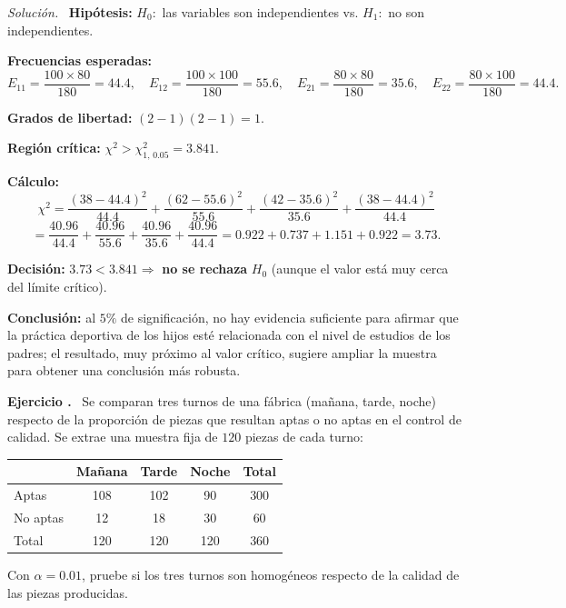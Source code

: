 \documentclass[11pt,a4paper]{article}
\newcounter{ejnum}
\newenvironment{ejercicio}{\refstepcounter{ejnum}\par\medskip\noindent\textbf{Ejercicio \theejnum.}~}{\par}
\newenvironment{solucion}{\par\noindent\textit{Solución.}~}{\par\vspace{1em}}
\begin{document}
\begin{solucion}
\textbf{Hipótesis:} $H_0:$ las variables son independientes vs. $H_1:$ no son independientes.

\textbf{Frecuencias esperadas:}
\[
E_{11}=\frac{100\times80}{180}=44.4,\quad E_{12}=\frac{100\times100}{180}=55.6,\quad E_{21}=\frac{80\times80}{180}=35.6,\quad E_{22}=\frac{80\times100}{180}=44.4.
\]

\textbf{Grados de libertad:} $(2-1)(2-1)=1$.

\textbf{Región crítica:} $\chi^2>\chi^2_{1,\,0.05}=3.841$.

\textbf{Cálculo:}
\[
\chi^2=\frac{(38-44.4)^2}{44.4}+\frac{(62-55.6)^2}{55.6}+\frac{(42-35.6)^2}{35.6}+\frac{(38-44.4)^2}{44.4}
\]
\[
=\frac{40.96}{44.4}+\frac{40.96}{55.6}+\frac{40.96}{35.6}+\frac{40.96}{44.4}=0.922+0.737+1.151+0.922=3.73.
\]

\textbf{Decisión:} $3.73<3.841\Rightarrow$ \textbf{no se rechaza} $H_0$ (aunque el valor está muy cerca del límite crítico).

\textbf{Conclusión:} al $5\%$ de significación, no hay evidencia suficiente para afirmar que la práctica deportiva de los hijos esté relacionada con el nivel de estudios de los padres; el resultado, muy próximo al valor crítico, sugiere ampliar la muestra para obtener una conclusión más robusta.
\end{solucion}

\begin{ejercicio}
Se comparan tres turnos de una fábrica (mañana, tarde, noche) respecto de la proporción de piezas que resultan aptas o no aptas en el control de calidad. Se extrae una muestra fija de $120$ piezas de cada turno:
\begin{center}
\begin{tabular}{@{}lccc|c@{}}
\toprule
 & Mañana & Tarde & Noche & Total \\
\midrule
Aptas & 108 & 102 & 90 & 300 \\
No aptas & 12 & 18 & 30 & 60 \\
\midrule
Total & 120 & 120 & 120 & 360 \\
\bottomrule
\end{tabular}
\end{center}
Con $\alpha=0.01$, pruebe si los tres turnos son homogéneos respecto de la calidad de las piezas producidas.
\end{ejercicio}
\end{document}
